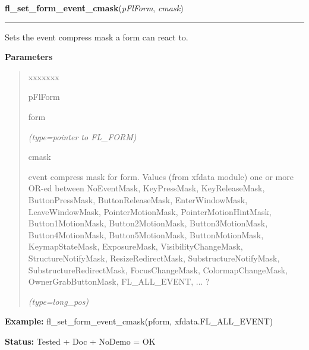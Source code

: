     \vspace{0.5ex}

\hspace{.8\funcindent}\begin{boxedminipage}{\funcwidth}

    \raggedright \textbf{fl\_set\_form\_event\_cmask}(\textit{pFlForm}, \textit{cmask})

    \vspace{-1.5ex}

    \rule{\textwidth}{0.5\fboxrule}
\setlength{\parskip}{2ex}
    Sets the event compress mask a form can react to.

\setlength{\parskip}{1ex}
      \textbf{Parameters}
      \vspace{-1ex}

      \begin{quote}
        \begin{Ventry}{xxxxxxx}

          \item[pFlForm]

          form

            {\it (type=pointer to FL\_FORM)}

          \item[cmask]

          event compress mask for form. Values (from xfdata module) one or 
          more OR-ed between NoEventMask, KeyPressMask, KeyReleaseMask, 
          ButtonPressMask, ButtonReleaseMask, EnterWindowMask, 
          LeaveWindowMask, PointerMotionMask, PointerMotionHintMask, 
          Button1MotionMask, Button2MotionMask, Button3MotionMask, 
          Button4MotionMask, Button5MotionMask, ButtonMotionMask, 
          KeymapStateMask, ExposureMask, VisibilityChangeMask, 
          StructureNotifyMask, ResizeRedirectMask, SubstructureNotifyMask, 
          SubstructureRedirectMask, FocusChangeMask, ColormapChangeMask, 
          OwnerGrabButtonMask, FL\_ALL\_EVENT, ... ?

            {\it (type=long\_pos)}

        \end{Ventry}

      \end{quote}

\textbf{Example:} fl\_set\_form\_event\_cmask(pform, xfdata.FL\_ALL\_EVENT)



\textbf{Status:} Tested + Doc + NoDemo = OK



    \end{boxedminipage}

